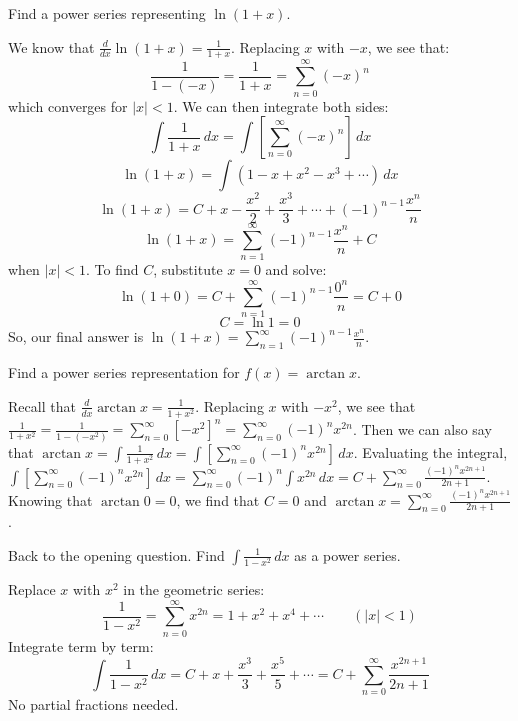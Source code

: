 \begin{Worked}
\begin{Problem}
Find a power series representing $\ln{(1+x)}$. 
\end{Problem}
\begin{Solution}
We know that $\frac{d}{dx} \ln{(1+x)} = \frac{1}{1+x}$.
Replacing $x$ with $-x$, we see that:
$$\frac{1}{1-(-x)} = \frac{1}{1+x} = \sum_{n=0}^\infty (-x)^n$$
which converges for $|x| < 1$. We can then integrate both sides:
$$\int \frac{1}{1+x}\,dx = \int \left[ \sum_{n=0}^\infty (-x)^n \right] \,dx$$
$$\ln{(1 + x)} = \int \left( 1 - x + x^2 - x^3 + \cdots \right)\,dx $$
$$\ln{(1 + x)} = C + x - \frac{x^2}{2} + \frac{x^3}{3} + \cdots + (-1)^{n-1} \frac{x^n}{n}$$
$$\ln{(1 + x)} = \sum_{n=1}^\infty (-1)^{n-1} \frac{x^n}{n} + C$$
when $|x|<1$. To find $C$, substitute $x = 0$ and solve:
$$\ln{(1 + 0)} = C + \sum_{n=1}^\infty (-1)^{n-1} \frac{0^n}{n} = C + 0$$
$$C = \ln{1} = 0$$
So, our final answer is $\ln{(1 + x)} = \sum_{n=1}^\infty (-1)^{n-1} \frac{x^n}{
n}$. 
\end{Solution}
\end{Worked}

\begin{Exercise}[label = seriescalc1]
Find a power series representation for $f(x) = \arctan{x}$. 
\end{Exercise}

\begin{Answer}[ref = seriescalc1]
Recall that $\frac{d}{dx} \arctan{x} = \frac{1}{1+x^2}$. Replacing $x$ with 
$-x^2$, we see that $\frac{1}{1 + x^2} = \frac{1}{1- (-x^2)} = \sum_{n=0}^
\infty \left[ -x^2 \right]^n = \sum_{n=0}^\infty (-1)^n x^{2n}$. Then we can 
also say that $\arctan{x} = \int \frac{1}{1 + x^2}\,dx = \int \left[ \sum_{n=0}
^\infty (-1)^n x^{2n} \right]\,dx$. Evaluating the integral, $\int \left[ \sum_
{n=0}^\infty (-1)^n x^{2n} \right]\,dx = \sum_{n=0}^\infty (-1)^n \int 
x^{2n}\,dx = C + \sum_{n=0}^\infty \frac{(-1)^n x^{2n+1}}{2n+1}$. Knowing that 
$\arctan{0} = 0$, we find that $C = 0$ and $\arctan{x} = \sum_{n=0}^\infty 
\frac{(-1)^n x^{2n+1}}{2n+1}$. 
\end{Answer}

\begin{Worked}
\begin{Problem}
Back to the opening question. Find $\int \frac{1}{1-x^2}\,dx$
as a power series.
\end{Problem}
\begin{Solution}
Replace $x$ with $x^2$ in the geometric series:
$$\frac{1}{1-x^2} = \sum_{n=0}^\infty x^{2n} = 1 + x^2 + x^4 + \cdots \qquad (|x| < 1)$$
Integrate term by term:
$$\int \frac{1}{1-x^2}\,dx = C + x + \frac{x^3}{3} + \frac{x^5}{5} + \cdots = C + \sum_{n=0}^\infty \frac{x^{2n+1}}{2n+1}$$
No partial fractions needed.
\end{Solution}
\end{Worked}

